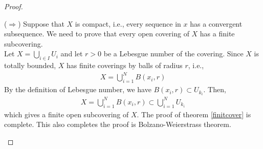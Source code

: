 \documentclass[12pt,leqno]{amsart}
\theoremstyle{definition}
\numberwithin{equation}{subsection}
\begin{document}
\begin{proof}
\begin{enumerate}
    ($\Rightarrow$) Suppose that $X$ is compact, i.e., every sequence in $x$ has a convergent subsequence. We need to prove that every open covering of $X$ has a finite subcovering. \\
    Let $X = \bigcup_{i\in I}U_i$ and let $r>0$ be a Lebesgue number of the covering. Since $X$ is totally bounded, $X$ has finite coverings by balls of radius $r$, i.e.,
    \begin{align*}
        X = \bigcup^N_{i=1}B(x_i,r)
    \end{align*}
    By the definition of Lebesgue number, we have $B(x_i,r)\subset U_{k_i}$. Then,
    \begin{align*}
        X = \bigcup^N_{i=1}B(x_i,r) \subset \bigcup^N_{i=1}U_{k_i}
    \end{align*}
    which gives a finite open subcovering of $X$. The proof of theorem \ref{finitcover} is complete. This also completes the proof is Bolzano-Weierstrass theorem.
\end{enumerate}
\end{proof}

\medskip
\end{document}
